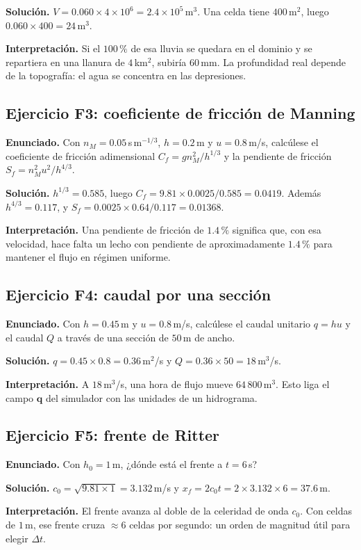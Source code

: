 \documentclass[11pt,a4paper]{article}
\begin{document}
\textbf{Solución.} $V=0.060\times4\times10^6=2.4\times10^5$\,m$^3$. Una celda tiene $400$\,m$^2$, luego
$0.060\times400=24$\,m$^3$.

\textbf{Interpretación.} Si el $100\,\mathrm{\%}$ de esa lluvia se quedara en el dominio y se repartiera en una
llanura de $4$\,km$^2$, subiría $60$\,mm. La profundidad real depende de la topografía: el agua se concentra
en las depresiones.

\subsection*{Ejercicio F3: coeficiente de fricción de Manning}
\textbf{Enunciado.} Con $n_M=0.05$\,s\,m$^{-1/3}$, $h=0.2$\,m y $u=0.8$\,m/s, calcúlese el coeficiente
de fricción adimensional $C_f=gn_M^2/h^{1/3}$ y la pendiente de fricción $S_f=n_M^2u^2/h^{4/3}$.

\textbf{Solución.} $h^{1/3}=0.585$, luego $C_f=9.81\times0.0025/0.585=0.0419$. Además $h^{4/3}=0.117$, y
$S_f=0.0025\times0.64/0.117=0.01368$.

\textbf{Interpretación.} Una pendiente de fricción de $1.4\,\mathrm{\%}$ significa que, con esa velocidad, hace falta
un lecho con pendiente de aproximadamente $1.4\,\mathrm{\%}$ para mantener el flujo en régimen uniforme.

\subsection*{Ejercicio F4: caudal por una sección}
\textbf{Enunciado.} Con $h=0.45$\,m y $u=0.8$\,m/s, calcúlese el caudal unitario $q=hu$ y el caudal $Q$ a
través de una sección de $50$\,m de ancho.

\textbf{Solución.} $q=0.45\times0.8=0.36$\,m$^2$/s y $Q=0.36\times50=18$\,m$^3$/s.

\textbf{Interpretación.} A $18$\,m$^3$/s, una hora de flujo mueve $64\,800$\,m$^3$. Esto liga el campo
$\boldsymbol q$ del simulador con las unidades de un hidrograma.

\subsection*{Ejercicio F5: frente de Ritter}
\textbf{Enunciado.} Con $h_0=1$\,m, ¿dónde está el frente a $t=6$\,s?

\textbf{Solución.} $c_0=\sqrt{9.81\times1}=3.132$\,m/s y $x_f=2c_0t=2\times3.132\times6=37.6$\,m.

\textbf{Interpretación.} El frente avanza al doble de la celeridad de onda $c_0$. Con celdas de $1$\,m, ese
frente cruza $\approx6$ celdas por segundo: un orden de magnitud útil para elegir $\Delta t$.
\end{document}
